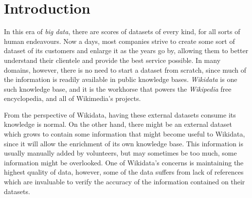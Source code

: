 \documentclass[epsfig,a4paper,11pt,titlepage,twoside,openany]{book}
\begin{document}
      



\chapter{Introduction}
\label{chap:introduction}

In this era of \textit{big data}, there are scores of datasets of every kind, for all sorts of human endeavours. Now a days, most companies strive to create some sort of dataset of its customers and enlarge it as the years go by, allowing them to better understand their clientele and provide the best service possible. In many domains, however, there is no need to start a dataset from scratch, since much of the information is readily available in public knowledge bases. \textit{Wikidata} is one such knowledge base, and it is the workhorse that powers the \textit{Wikipedia} free encyclopedia, and all of Wikimedia's projects.

From the perspective of Wikidata, having these external datasets consume its knowledge is normal. On the other hand, there might be an external dataset which grows to contain some information that might become useful to Wikidata, since it will allow the enrichment of its own knowledge base. This information is usually manually added by volunteers, but may sometimes be too much, some information might be overlooked. One of Wikidata's concerns is maintaining the highest quality of data, however, some of the data suffers from lack of references which are invaluable to verify the accuracy of the information contained on their datasets.
\end{document}
